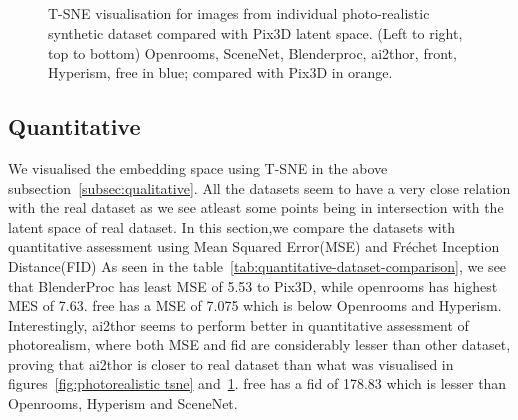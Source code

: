 \begin{figure}[!ht]
    \centering
    \resizebox{0.49\linewidth}{5cm}{}
    \resizebox{0.49\linewidth}{5cm}{}\\
    \resizebox{0.49\linewidth}{5cm}{}
    \resizebox{0.49\linewidth}{5cm}{}\\
    \resizebox{0.49\linewidth}{5cm}{}
    \resizebox{0.49\linewidth}{5cm}{}\\
    \resizebox{0.49\linewidth}{5cm}{}\\

    \caption{T-SNE visualisation for images from individual photo-realistic synthetic dataset compared with Pix3D latent space.
        (Left to right, top to bottom) Openrooms, SceneNet, Blenderproc, \gls{ai2thor}, \gls{front}, Hyperism, \gls{free} in blue;
        compared with Pix3D in orange.}
    \label{fig:tsne per dataset}
\end{figure}


\subsection{Quantitative}\label{subsec:quantitative}

We visualised the embedding space using T-SNE in the above subsection~\ref{subsec:qualitative}.
All the datasets seem to have a very close relation with the real dataset as we see atleast some points being in intersection with the latent space of real dataset.
In this section,we compare the datasets with quantitative assessment using Mean Squared Error(MSE) and Fr\'echet Inception Distance(FID)
As seen in the table~\ref{tab:quantitative-dataset-comparison}, we see that BlenderProc has least MSE of 5.53 to Pix3D,
while openrooms has highest MES of 7.63.
\gls{free} has a MSE of 7.075 which is below Openrooms and Hyperism.
Interestingly, \gls{ai2thor} seems to perform better in quantitative assessment of photorealism,
where both MSE and \gls{fid} are considerably lesser than other dataset,
proving that \gls{ai2thor} is closer to real dataset than what was visualised in figures~\ref{fig:photorealistic tsne} and~\ref{fig:tsne per dataset}.
\gls{free} has a \gls{fid} of 178.83 which is lesser than Openrooms, Hyperism and SceneNet.

